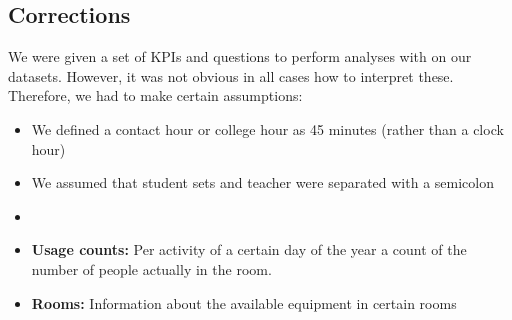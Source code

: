 \subsection{Corrections}
We were given a set of KPIs and questions to perform analyses with on our datasets. However, it was not obvious in all cases how to interpret these. Therefore, we had to make certain assumptions:
\begin{itemize}
	\item We defined a contact hour or college hour as 45 minutes (rather than a clock hour)
	\item We assumed that student sets and teacher were separated with a semicolon
	\item 
	\item \textbf{Usage counts:} Per activity of a certain day of the year a count of the number of people actually in the room.
	\item\textbf{Rooms:} Information about the available equipment in certain rooms
\end{itemize}